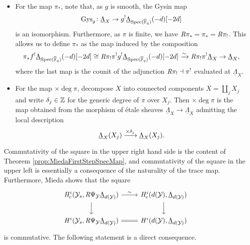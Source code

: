 \documentclass[../main.tex]{subfiles}
\begin{document}
\begin{itemize}
  \item For the map $\pi_*$, note that, as $g$ is smooth, the Gysin map 
    \begin{equation*}
    \mathrm{Gys}_g \colon \underline \Lambda_{X} \to g^! \underline
    \Lambda_{\operatorname{Spec}({\overline {\mathbb{F}}_q})}(-d)[-2d] 
    \end{equation*}
    is an isomorphism. 
    Furthermore, as $\pi$ is finite, we have $\mathit R \pi_* = \pi_* =
    \mathit R \pi_!$. This allows us to define $\pi_*$ as the map induced by the
    composition
    \begin{equation*}
      \pi_* f^! \underline \Lambda_{\operatorname{Spec}({\overline {\mathbb{F}}_q})}(-d)[-2d]
      \cong \mathit R\pi_! \pi^! g^! \underline \Lambda_{\operatorname{Spec}({\overline {\mathbb{F}}_q})}(-d)[-2d] 
      \xrightarrow{\sim} \mathit R \pi_! \pi^! \underline \Lambda_{X}
      \to \underline \Lambda_{X},
    \end{equation*}
    where the last map is the counit of the adjunction $\mathit R \pi_! \dashv \pi^!$
    evaluated at $\underline \Lambda_{X}$.
  \item For the map $\times \deg \pi$, decompose $X$ into connected components
    $X = \coprod_j X_j$ and write $\delta_j \in \mathbb{Z}$ for the generic degree of 
    $\pi$ over $X_j$. Then $\times \deg\pi$ is the map obtained from the morphism
    of \'etale sheaves $\underline \Lambda_X \to \underline \Lambda_X$ admitting
    the local description
    \begin{equation*}
      \underline \Lambda_{X}(X_j) \xrightarrow{\times \delta_j} \underline \Lambda_{X}(X_j).
    \end{equation*}
\end{itemize}
Commutativity of the square in the upper right hand side is the content of
Theorem \ref{prop:MiedaFirstStepSpecMap}, and commutativity of the square in the
upper left is essentially a consequence of the naturality of the trace map.
Furthermore, Mieda shows that the square
\begin{equation*}
\begin{tikzcd}[ampersand replacement=\&]
	{\hHc^i(\cY_s, \derR \Psi_\cY \underline \Lambda_{d(\cY)})} \& 
  {\hHc^i(d(\cY), \underline \Lambda_{d(\cY)})} \\
	{\hH^i(\cY_s, \derR \Psi_\cY \underline \Lambda_{d(\cY)})} \& 
  {\hH^i(d(\cY), \underline \Lambda_{d(\cY)})} 
	\arrow["\sim", from=1-1, to=1-2]
	\arrow[from=1-1, to=2-1]
	\arrow[from=1-2, to=2-2]
	\arrow[Rightarrow, no head, from=2-1, to=2-2]
\end{tikzcd}
\end{equation*}
is commutative. The following statement is a direct consequence.
\end{document}

